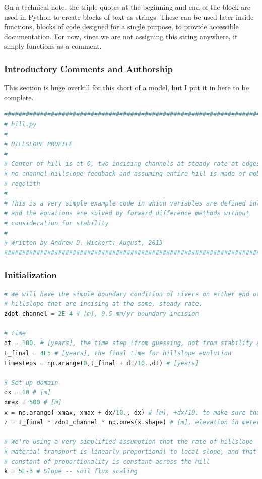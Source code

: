 \documentclass[a4paper,10pt]{scrartcl}
\begin{document}
On a technical note, the triple quotes at the beginning and end of the block are used in Python to create blocks of text as strings. These can be used later inside functions, blocks of code designed for a single purpose, to provide accessible documentation. For now, since we are not assigning this string anywhere, it simply functions as a comment.

\subsubsection{Introductory Comments and Authorship}

This section is huge overkill for this short of a model, but I put it in here to be complete.

\begin{lstlisting}[language=Python]
################################################################################
# hill.py
# 
# HILLSLOPE PROFILE
# 
# Center of hill is at 0, two incising channels at steady rate at edges
# no channel-hillslope feedback and assuming entire hill is made of mobile 
# regolith
# 
# This is a very simple example code in which variables are defined inline, 
# and the equations are solved by forward difference methods without 
# consideration for stability
# 
# Written by Andrew D. Wickert; August, 2013
################################################################################
\end{lstlisting}

\subsubsection{Initialization}

\begin{lstlisting}[language=Python]
# We will have the simple boundary condition of rivers on either end of the 
# hillslope that are incising at the same, steady rate.
zdot_channel = 2E-4 # [m], 0.5 mm/yr boundary incision

# time
dt = 100. # [years], the time step (from guessing, not from stability analysis)
t_final = 4E5 # [years], the final time for hillslope evolution
timesteps = np.arange(0,t_final + dt/10.,dt) # [years]

# Set up domain
dx = 10 # [m]
xmax = 500 # [m]
x = np.arange(-xmax, xmax + dx/10., dx) # [m], +dx/10. to make sure that edges are included
z = t_final * zdot_channel * np.ones(x.shape) # [m], elevation in meters - set such that the edges are 0 at t_final

# We're using a very simplified assumption that the rate of hillslope 
# material transport is linearly proportional to local slope, and that this 
# constant of proportionality is constant across the hill
k = 5E-3 # Slope -- soil flux scaling
\end{lstlisting}
\end{document}
